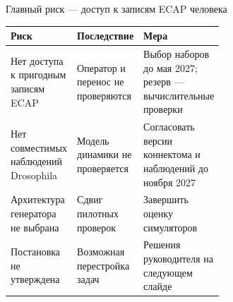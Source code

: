 \begin{frame}{Главный риск --- доступ к записям ECAP человека}
\begin{tabularx}{\linewidth}{|L{0.31\linewidth}|L{0.29\linewidth}|Y|}
\hline Риск & Последствие & Мера \\\hline
Нет доступа к пригодным записям ECAP & Оператор и перенос не проверяются & Выбор наборов до мая 2027; резерв --- вычислительные проверки \\\hline
Нет совместимых наблюдений Drosophila & Модель динамики не проверяется & Согласовать версии коннектома и наблюдений до ноября 2027 \\\hline
Архитектура генератора не выбрана & Сдвиг пилотных проверок & Завершить оценку симуляторов \\\hline
Постановка не утверждена & Возможная перестройка задач & Решения руководителя на следующем слайде \\\hline
\end{tabularx}
\end{frame}
